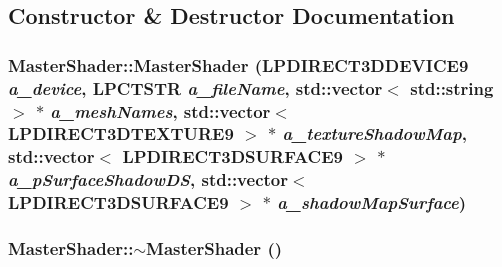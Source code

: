 \subsection{Constructor \& Destructor Documentation}
\hypertarget{class_master_shader_a07596b503827f3daff4bff10acad03ac}{
\subsubsection[{MasterShader}]{\setlength{\rightskip}{0pt plus 5cm}MasterShader::MasterShader (LPDIRECT3DDEVICE9 {\em a\_\-device}, \/  LPCTSTR {\em a\_\-fileName}, \/  std::vector$<$ std::string $>$ $\ast$ {\em a\_\-meshNames}, \/  std::vector$<$ LPDIRECT3DTEXTURE9 $>$ $\ast$ {\em a\_\-textureShadowMap}, \/  std::vector$<$ LPDIRECT3DSURFACE9 $>$ $\ast$ {\em a\_\-pSurfaceShadowDS}, \/  std::vector$<$ LPDIRECT3DSURFACE9 $>$ $\ast$ {\em a\_\-shadowMapSurface})}}
\label{class_master_shader_a07596b503827f3daff4bff10acad03ac}
\hypertarget{class_master_shader_af92e2ec718026698de2edcfc4c20948c}{
\subsubsection[{$\sim$MasterShader}]{\setlength{\rightskip}{0pt plus 5cm}MasterShader::$\sim$MasterShader ()}}
\label{class_master_shader_af92e2ec718026698de2edcfc4c20948c}


